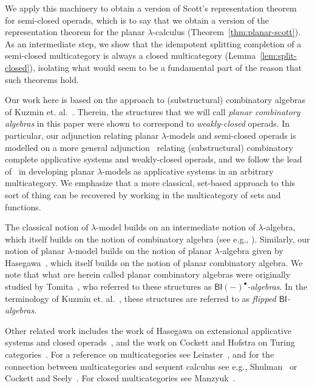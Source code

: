 \documentclass{llncs}
\begin{document}
We apply this machinery to obtain a version of Scott's representation theorem~\cite{Scott1980} for semi-closed operads, which is to say that we obtain a version of the representation theorem for the planar $\lambda$-calculus (Theorem~\ref{thm:planar-scott}). As an intermediate step, we show that the idempotent splitting completion of a semi-closed multicategory is always a closed multicategory (Lemma~\ref{lem:split-closed}), isolating what would seem to be a fundamental part of the reason that such theorems hold.

Our work here is based on the approach to (substructural) combinatory algebras of Kuzmin et. al.~\cite{Kuzmin2026,Kuzmin2026Journal}. Therein, the structures that we will call \emph{planar combinatory algebras} in this paper were shown to correspond to \emph{weakly-closed} operads. In particular, our adjunction relating planar $\lambda$-models and semi-closed operads is modelled on a more general adjunction~\cite[Theorem 6.12]{Kuzmin2026Journal} relating (substructural) combinatory complete applicative systems and weakly-closed operads, and we follow the lead of~\cite{Kuzmin2026Journal} in developing planar $\lambda$-models as applicative systems in an arbitrary multicategory. We emphasize that a more classical, set-based approach to this sort of thing can be recovered by working in the multicategory of sets and functions.

The classical notion of $\lambda$-model builds on an intermediate notion of $\lambda$-algebra, which itself builds on the notion of combinatory algebra (see e.g., \cite{Barendregt1981,Hindley2008}). Similarly, our notion of planar $\lambda$-model builds on the notion of planar $\lambda$-algebra given by Hasegawa~\cite{Hasegawa2023Planar}, which itself builds on the notion of planar combinatory algebra. We note that what are herein called planar combinatory algebras were originally studied by Tomita~\cite{Tomita2021,Tomita2022,Tomita2023}, who referred to these structures as \emph{$\mathsf{BI}(-)^\bullet$-algebras}. In the terminology of Kuzmin et. al.~\cite{Kuzmin2026Journal}, these structures are referred to as \emph{flipped $\mathsf{BI}$-algebras}. 

Other related work includes the work of Hasegawa on extensional applicative systems and closed operads~\cite{Hasegawa2023,Hasegawa2024}, and the work on Cockett and Hofstra on Turing categories~\cite{Cockett2008}. For a reference on multicategories see Leinster~\cite{Leinster2004}, and for the connection between multicategories and sequent calculus see e.g., Shulman~\cite{Shulman2016} or Cockett and Seely~\cite{Cockett2017}. For closed multicategories see Manzyuk~\cite{Manzyuk2012}.
\end{document}
